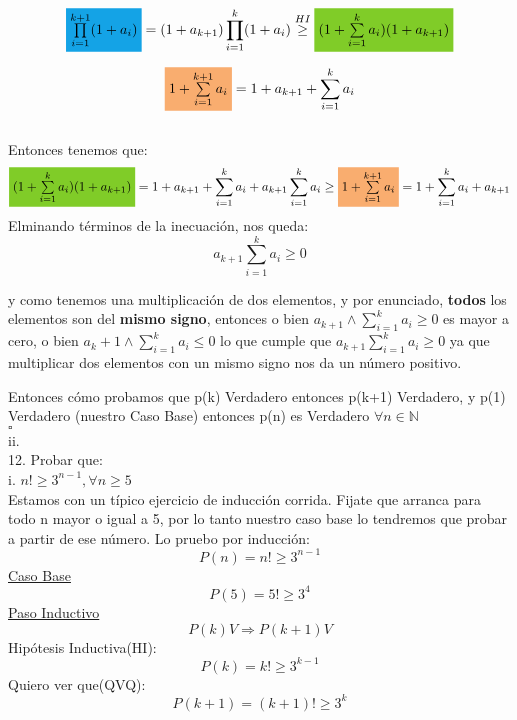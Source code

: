 \documentclass[a4paper,11pt]{article}
\begin{document}
\[ \colorbox{Cerulean}{$\prod\limits_{i=1}^{k+1}(1+a_i)$} = (1+a_{k+1}) \prod\limits_{i=1}^{k}(1+a_i) \stackrel{HI}{\geq} \colorbox{LimeGreen}{$(1 + \sum\limits_{i=1}^{k} a_i)(1+a_{k+1})$} \]

\[ \colorbox{Apricot}{$1 + \sum\limits_{i=1}^{k+1} a_i $} = 1+a_{k+1} + \sum\limits_{i=1}^{k} a_i \]
\\
Entonces tenemos que:
\[\colorbox{LimeGreen}{$ (1 + \sum\limits_{i=1}^{k} a_i)(1+a_{k+1})$} = 1 + a_{k+1} + \sum\limits_{i=1}^{k} a_i + a_{k+1} \sum\limits_{i=1}^{k} a_i \geq \colorbox{Apricot}{$1 + \sum\limits_{i=1}^{k+1} a_i$} = 1 + \sum\limits_{i=1}^{k} a_i + a_{k+1} \] 
Elminando términos de la inecuación, nos queda:\\
\[ a_{k+1} \sum\limits_{i=1}^{k} a_i \geq 0\] 

y como tenemos una multiplicación de dos elementos, y por enunciado, \textbf{todos} los elementos son del \textbf{mismo signo}, entonces o bien $a_{k+1} \land \sum\limits_{i=1}^{k} a_i \geq 0 $ es mayor a cero, o bien $a_k+1 \land \sum\limits_{i=1}^{k} a_i \leq 0 $  lo que cumple que $a_{k+1} \sum\limits_{i=1}^{k} a_i \geq 0$ ya que multiplicar dos elementos con un mismo signo nos da un número positivo.
 
Entonces cómo probamos que p(k) Verdadero entonces p(k+1) Verdadero, y p(1) Verdadero (nuestro Caso Base) entonces p(n) es Verdadero $\forall n\in\mathbb{N}$\\

\hfill$\square $\\
ii.\\
12. Probar que:\\
i. $n! \geq 3^{n-1}, \forall n\geq 5 $\\

Estamos con un típico ejercicio de inducción corrida. Fijate que arranca para todo n mayor o igual a 5, por lo tanto nuestro caso base lo tendremos que probar a partir de ese número.
Lo pruebo por inducción:\\
\[ P(n) = n! \geq 3^{n-1} \]
\underline{Caso Base}\\
\[ P(5) = 5! \geq 3^{4} \] 
\underline{Paso Inductivo}\\
\[P(k) V \Rightarrow P(k+1) V\]
Hipótesis Inductiva(HI):\[ P(k) = k! \geq 3^{k-1} \]
Quiero ver que(QVQ):\[ P(k+1) = (k+1)! \geq 3^{k} \]
\end{document}
